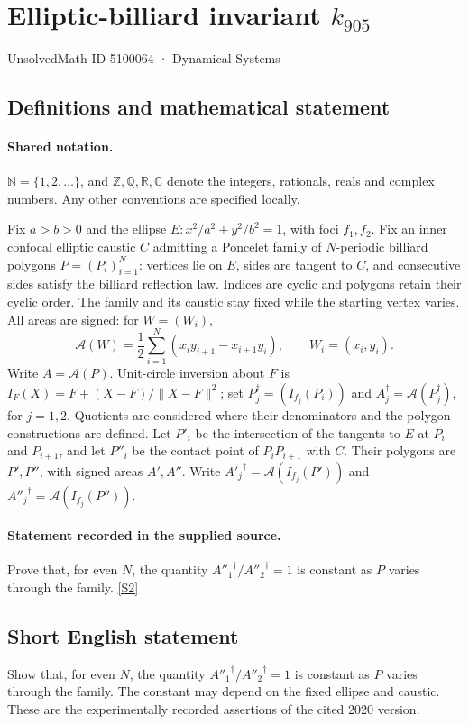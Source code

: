 \documentclass[11pt]{article}
\newcommand{\sref}[2]{\hyperlink{source:#1:#2}{[S#2]}}
\begin{document}
\setcounter{section}{5100063}
\section{Elliptic-billiard invariant $k_{905}$}\label{5100064}
{\small\sffamily UnsolvedMath ID 5100064 · Dynamical Systems}
\subsection{Definitions and mathematical statement}

\paragraph{Shared notation.}$\mathbb N=\{1,2,\ldots\}$, and $\mathbb Z,\mathbb Q,\mathbb R,\mathbb C$ denote the integers, rationals, reals and complex numbers. Any other conventions are specified locally.


Fix $a>b>0$ and the ellipse $E:x^2/a^2+y^2/b^2=1$, with foci $f_1,f_2$. Fix an inner confocal elliptic caustic $C$ admitting a Poncelet family of $N$-periodic billiard polygons $P=(P_i)_{i=1}^N$: vertices lie on $E$, sides are tangent to $C$, and consecutive sides satisfy the billiard reflection law. Indices are cyclic and polygons retain their cyclic order. The family and its caustic stay fixed while the starting vertex varies. All areas are signed: for $W=(W_i)$,
\[\mathcal A(W)=\frac12\sum_{i=1}^N(x_i y_{i+1}-x_{i+1}y_i),\qquad W_i=(x_i,y_i).\]
Write $A=\mathcal A(P)$. Unit-circle inversion about $F$ is $I_F(X)=F+(X-F)/\lVert X-F\rVert^2$; set $P_j^\dagger=(I_{f_j}(P_i))$ and $A_j^\dagger=\mathcal A(P_j^\dagger)$, for $j=1,2$. Quotients are considered where their denominators and the polygon constructions are defined. Let $P'_i$ be the intersection of the tangents to $E$ at $P_i$ and $P_{i+1}$, and let $P''_i$ be the contact point of $P_iP_{i+1}$ with $C$. Their polygons are $P',P''$, with signed areas $A',A''$. Write ${A'_j}^\dagger=\mathcal A(I_{f_j}(P'))$ and ${A''_j}^\dagger=\mathcal A(I_{f_j}(P''))$.
\paragraph{Statement recorded in the supplied source.}
Prove that, for even $N$, the quantity ${A''_1}^\dagger/{A''_2}^\dagger=1$ is constant as $P$ varies through the family. \sref{5100064}{2}
\subsection{Short English statement}
Show that, for even $N$, the quantity ${A''_1}^\dagger/{A''_2}^\dagger=1$ is constant as $P$ varies through the family. The constant may depend on the fixed ellipse and caustic. These are the experimentally recorded assertions of the cited 2020 version.
\end{document}
